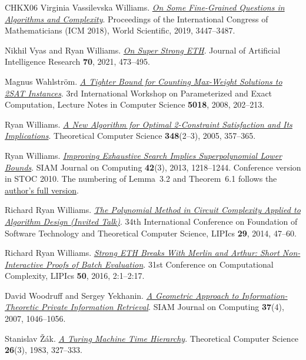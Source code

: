 \documentclass[11pt,reqno]{amsart}
\numberwithin{equation}{section}
\theoremstyle{definition}\newtheorem{definition}[theorem]{Definition}
\theoremstyle{remark}\newtheorem{remark}[theorem]{Remark}
\begin{document}
\begin{thebibliography}{CHKX06}
Virginia Vassilevska Williams.
\href{https://doi.org/10.1142/9789813272880_0188}
{\emph{On Some Fine-Grained Questions in Algorithms and Complexity}}.
Proceedings of the International Congress of Mathematicians (ICM 2018),
World Scientific, 2019, 3447--3487.

Nikhil Vyas and Ryan Williams.
\href{https://doi.org/10.1613/jair.1.11859}
{\emph{On Super Strong ETH}}.
Journal of Artificial Intelligence Research \textbf{70}, 2021, 473--495.

Magnus Wahlstr\"om.
\href{https://doi.org/10.1007/978-3-540-79723-4_19}
{\emph{A Tighter Bound for Counting Max-Weight Solutions to 2SAT Instances}}.
3rd International Workshop on Parameterized and Exact Computation,
Lecture Notes in Computer Science \textbf{5018}, 2008, 202--213.

Ryan Williams.
\href{https://doi.org/10.1016/j.tcs.2005.09.023}
{\emph{A New Algorithm for Optimal 2-Constraint Satisfaction and Its Implications}}.
Theoretical Computer Science \textbf{348}(2--3), 2005, 357--365.

Ryan Williams.
\href{https://doi.org/10.1137/10080703X}
{\emph{Improving Exhaustive Search Implies Superpolynomial Lower Bounds}}.
SIAM Journal on Computing \textbf{42}(3), 2013, 1218--1244.
Conference version in STOC 2010. The numbering of Lemma~3.2 and Theorem~6.1 follows the
\href{https://people.csail.mit.edu/rrw/improved-algs-lbs2.pdf}{author's full version}.

Richard Ryan Williams.
\href{https://doi.org/10.4230/LIPIcs.FSTTCS.2014.47}
{\emph{The Polynomial Method in Circuit Complexity Applied to Algorithm
Design (Invited Talk)}}.
34th International Conference on Foundation of Software Technology and
Theoretical Computer Science, LIPIcs \textbf{29}, 2014, 47--60.

Richard Ryan Williams.
\href{https://doi.org/10.4230/LIPIcs.CCC.2016.2}
{\emph{Strong ETH Breaks With Merlin and Arthur: Short Non-Interactive
Proofs of Batch Evaluation}}.
31st Conference on Computational Complexity, LIPIcs \textbf{50}, 2016,
2:1--2:17.

David Woodruff and Sergey Yekhanin.
\href{https://doi.org/10.1137/06065773X}
{\emph{A Geometric Approach to Information-Theoretic Private Information
Retrieval}}.
SIAM Journal on Computing \textbf{37}(4), 2007, 1046--1056.

Stanislav \v{Z}\'ak.
\href{https://doi.org/10.1016/0304-3975(83)90015-4}{\emph{A Turing
Machine Time Hierarchy}}.
Theoretical Computer Science \textbf{26}(3), 1983, 327--333.

\end{thebibliography}
\end{document}
